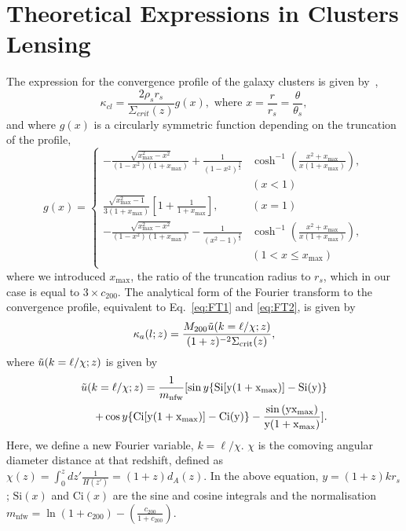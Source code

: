 \documentclass[prd, superscriptaddress, tightenlines, longbibliography, nofootinbib, eqsecnum, amsfonts, amsmath, floatfix, twocolumn, notitlepage]{revtex4-2}
\begin{document}
\section{Theoretical Expressions in Clusters Lensing}\label{A2}
The expression for the convergence profile of the galaxy clusters is given by~\cite{Takada:2002qq},
\begin{equation}
    \kappa_{cl} = \frac{2\rho_s r_s}{\Sigma_{crit}(z)}g(x), \text{ where } x=\frac{r}{r_s} = \frac{\theta}{\theta_s},
\end{equation}
and where $g(x)$ is a circularly symmetric function depending on the truncation of the profile,
\begin{equation}
    g(x) = 
     \begin{cases}
       -\frac{\sqrt{x_{\text{max}}^2-x^2}}{(1-x^2)(1+x_{\text{max}})} + \frac{1}{(1-x^2)^{\frac{3}{2}}}&\cosh^{-1}\left(\frac{x^2+x_{\text{max}}}{x(1+x_{\text{max}})}\right),  \\ &(x < 1)\\
       \frac{\sqrt{x_{\text{max}}^2 - 1}}{3(1+x_{\text{max}})}\left[ 1+\frac{1}{1+x_{\text{max}}} \right],  &(x = 1)\\
       -\frac{\sqrt{x_{\text{max}}^2-x^2}}{(1-x^2)(1+x_{\text{max}})} - \frac{1}{(x^2-1)^{\frac{3}{2}}}&\cosh^{-1}\left(\frac{x^2+x_{\text{max}}}{x(1+x_{\text{max}})}\right),  \\
       &(1< x \leq x_{\text{max}})\\
     \end{cases}
\end{equation}
where we introduced $x_{\text{max}}$, the ratio of the truncation radius to $r_s$, which in our case is equal to $3\times c_{200}$. 
The analytical form of the Fourier transform to the convergence profile, equivalent to Eq.~\ref{eq:FT1} and \ref{eq:FT2}, is given by \cite{Scoccimarro:2000gm, 2011PhRvD..83b3008O, Takada:2002qq}%
\begin{equation}\label{eq:ft_anal1}
    \kappa_{a}(l;z) = \frac{M_{200}\Tilde{u}(k=\ell/\chi;z)}{(1+z)^{-2}\Sigma_{\text{crit}}(z)},
\end{equation}
where $\Tilde{u}(k=\ell/\chi;z)$ is given by
\begin{align}\label{eq:ft_anal2}
    \Tilde{u}(k=\ell/\chi;z) = \frac{1}{m_{\text{nfw}}}[\sin{y}\{\text{Si}[y(1+x_{\text{max}})] -\text{Si}(y)\} \nonumber \\ 
    +\cos{y}\{ \text{Ci}[y(1+x_{\text{max}})]-\text{Ci}(y) \} - \frac{\sin{(y x_{\text{max}})}}{y(1+x_{\text{max}})}].
\end{align}
Here, we define a new Fourier variable, $k =\ell/\chi$. $\chi$ is the comoving angular diameter distance at that redshift, defined as $\chi(z) = \int_0^z dz'\frac{1}{H(z')} = (1+z)d_A(z)$. In the above equation, $y = (1+z)kr_s$; $\text{Si}(x)$ and $\text{Ci}(x)$ are the sine and cosine integrals and the normalisation $m_{\text{nfw}} = \ln{(1+c_{200})}-\left(\frac{c_{200}}{1+c_{200}}\right)$.
\end{document}

